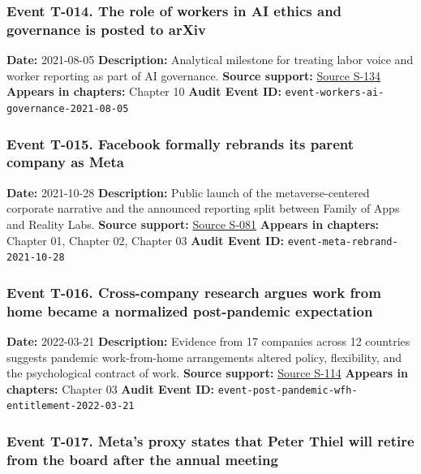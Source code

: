 \documentclass[
  american,
  11pt,
  letterpaper,
]{article}
\begin{document}
\subsubsection{Event T-014. The role of workers in AI ethics and
governance is posted to
arXiv}\label{event-t-014-the-role-of-workers-in-ai-ethics-and-governance-is-posted-to-arxiv}

\textbf{Date:} 2021-08-05 \textbf{Description:} Analytical milestone for
treating labor voice and worker reporting as part of AI governance.
\textbf{Source support:}
\hyperref[source-s-134-in-oxford-handbook-on-ai-governance-the-role-of-workers-in-ai-ethics-and-governance]{Source
S-134} \textbf{Appears in chapters:} Chapter 10 \textbf{Audit Event ID:}
\texttt{event-workers-ai-governance-2021-08-05}

\subsubsection{Event T-015. Facebook formally rebrands its parent
company as
Meta}\label{event-t-015-facebook-formally-rebrands-its-parent-company-as-meta}

\textbf{Date:} 2021-10-28 \textbf{Description:} Public launch of the
metaverse-centered corporate narrative and the announced reporting split
between Family of Apps and Reality Labs. \textbf{Source support:}
\hyperref[source-s-081-the-facebook-company-is-now-meta]{Source S-081}
\textbf{Appears in chapters:} Chapter 01, Chapter 02, Chapter 03
\textbf{Audit Event ID:} \texttt{event-meta-rebrand-2021-10-28}

\subsubsection{Event T-016. Cross-company research argues work from home
became a normalized post-pandemic
expectation}\label{event-t-016-cross-company-research-argues-work-from-home-became-a-normalized-post-pandemic-expectation}

\textbf{Date:} 2022-03-21 \textbf{Description:} Evidence from 17
companies across 12 countries suggests pandemic work-from-home
arrangements altered policy, flexibility, and the psychological contract
of work. \textbf{Source support:}
\hyperref[source-s-114-work-from-home-is-here-to-stay-call-for-flexibility-in-post-pandemic-work-policies]{Source
S-114} \textbf{Appears in chapters:} Chapter 03 \textbf{Audit Event ID:}
\texttt{event-post-pandemic-wfh-entitlement-2022-03-21}

\subsubsection{Event T-017. Meta's proxy states that Peter Thiel will
retire from the board after the annual
meeting}\label{event-t-017-meta-s-proxy-states-that-peter-thiel-will-retire-from-the-board-after-the-annual-meeting}
\end{document}
